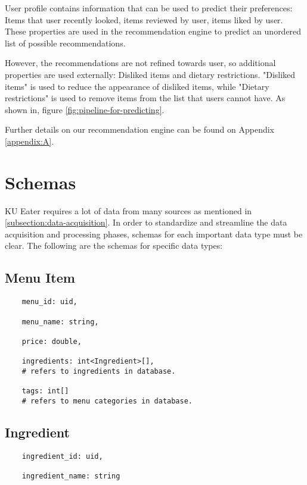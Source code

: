 User profile contains information that can be used to predict their preferences: Items that user recently looked, items reviewed by user, items liked by user.
These properties are used in the recommendation engine to predict an unordered list of possible recommendations.

However, the recommendations are not refined towards user, so additional properties are used externally: Disliked items and dietary restrictions.
"Disliked items" is used to reduce the appearance of disliked items, while "Dietary restrictions" is used to remove items from the list that users
cannot have. As shown in, figure \ref{fig:pipeline-for-predicting}.

Further details on our recommendation engine can be found on Appendix \ref{appendix:A}.

\section{Schemas}
\label{section:data-schema}

KU Eater requires a lot of data from many sources as mentioned in \ref{subsection:data-acquisition}. In order to standardize and streamline the
data acquisition and processing phases, schemas for each important data type must be clear. The following are the schemas for specific data types:

\subsection{Menu Item}
\label{schema:menu-item}
\begin{verbatim}
    menu_id: uid,
    
    menu_name: string,

    price: double,
    
    ingredients: int<Ingredient>[],
    # refers to ingredients in database.
    
    tags: int[]
    # refers to menu categories in database.
\end{verbatim}

\subsection{Ingredient}
\label{schema:ingredient}
\begin{verbatim}
    ingredient_id: uid,
    
    ingredient_name: string
\end{verbatim}

